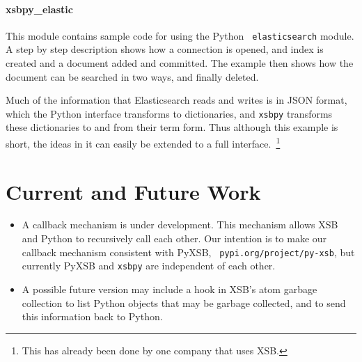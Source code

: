 \paragraph{xsbpy\_elastic}
This module contains sample code for using the Python {\tt
  elasticsearch} module.  A step by step description shows how a
connection is opened, and index is created and a document added and
committed.  The example then shows how the document can be searched in
two ways, and finally deleted.

Much of the information that Elasticsearch reads and writes is in JSON
format, which the Python interface transforms to dictionaries, and
{\tt xsbpy} transforms these dictionaries to and from their term form.
Thus although this example is short, the ideas in it can easily be
extended to a full interface.~\footnote{This has already been done by
  one company that uses XSB.}


\section{Current and Future Work}

\begin{itemize}
\item A callback mechanism is under development.  This mechanism
  allows XSB and Python to recursively call each other.  Our intention
  is to make our callback mechanism consistent with PyXSB, {\tt
    pypi.org/project/py-xsb}, but currently PyXSB and {\tt xsbpy} are
  independent of each other.

\item A possible future version may include a hook in XSB's atom
  garbage collection to list Python objects that may be garbage
  collected, and to send this information back to Python.  
\end{itemize}  
